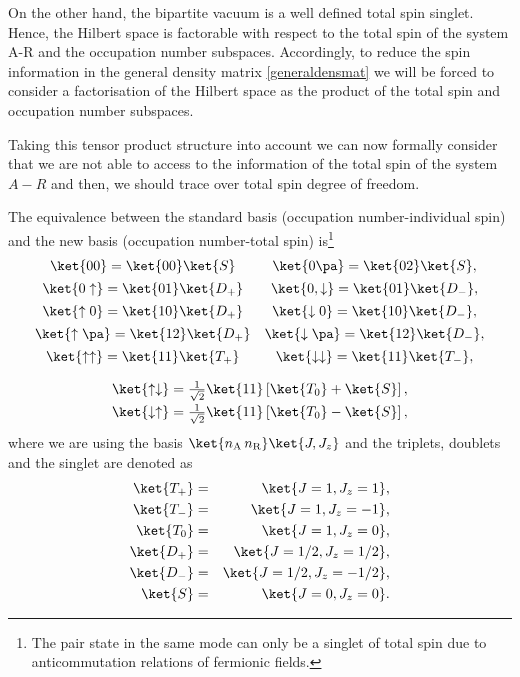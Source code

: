 On the other hand, the bipartite vacuum is a well defined total spin singlet. Hence, the Hilbert space is factorable with respect to the total spin of the system A-R and the occupation number subspaces. Accordingly, to reduce the spin information in the general density matrix \eqref{generaldensmat} we will be forced to consider a factorisation of the Hilbert space as the product of the total spin and occupation number subspaces.

Taking this tensor product structure into account we can now formally consider that we are not able to access to the information of the total spin of the system $A-R$ and then, we should trace over total spin degree of freedom.

The equivalence between the standard basis (occupation number-individual spin) and the new basis (occupation number-total spin) is\footnote{The pair state in the same mode can only be a singlet of total spin due to anticommutation relations of fermionic fields.}
\begin{equation}\label{e1}
\begin{array}{cc}
\ket{00}=\ket{00}\ket{S}& \ket{0\pa}=\ket{02}\ket{S},\\*[1.5mm]
\ket{0\uparrow}=\ket{01}\ket{D_+}& \ket{0,\downarrow}=\ket{01}\ket{D_-},\\*[1.5mm]
\ket{\uparrow0}=\ket{10}\ket{D_+}&\ket{\downarrow0}=\ket{10}\ket{D_-},\\*[1.5mm]
\ket{\uparrow\pa}=\ket{12}\ket{D_+}&\ket{\downarrow\pa}=\ket{12}\ket{D_-},\\*[1.5mm]
\ket{\uparrow\uparrow}=\ket{11}\ket{T_+}&\ket{\downarrow\downarrow}=\ket{11}\ket{T_-},\\*[1.5mm]
\end{array}
\end{equation}
\begin{equation}\label{e2}
\begin{array}{c}
\ket{\uparrow\downarrow}=\frac{1}{\sqrt{2}}\ket{11}\left[\ket{T_0}+\ket{S}\right],\\*[1.5mm]
\ket{\downarrow\uparrow}=\frac{1}{\sqrt{2}}\ket{11}\left[\ket{T_0}-\ket{S}\right],
\end{array}
\end{equation}
where we are using the basis $\ket{n_\text{A}\,n_\text{R}}\ket{J,J_z}$ and the triplets, doublets and the singlet are denoted as
\begin{eqnarray}
\nonumber\ket{T_+}&=&\ket{J=1,J_z=1},\\*
\nonumber\ket{T_-}&=&\ket{J=1,J_z=-1},\\*
\nonumber\ket{T_0}&=&\ket{J=1,J_z=0},\\*
\nonumber\ket{D_+}&=&\ket{J=1/2,J_z=1/2},\\*
\nonumber\ket{D_-}&=&\ket{J=1/2,J_z=-1/2},\\*
\nonumber\ket{S}&=&\ket{J=0,J_z=0}.\\*
\end{eqnarray}
